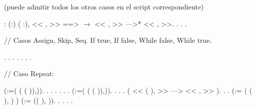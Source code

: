\documentclass[12pt]{report}
\begin{document}
 (puede admitir todos los otros casos en el script correspondiente) \begin{coqdoccode}
\coqdocemptyline
\coqdocemptyline
\coqdocnoindent
{} : \coqdockw{\ensuremath{\forall}} (:) ( :), << , >> ==>  \coqdoceol
\coqdocindent{13.00em}
\ensuremath{\rightarrow}  << , >> --->* << ,  >>.\coqdoceol
\coqdocnoindent
{}.\coqdoceol
\coqdocnoindent
{}.\coqdoceol
\coqdocnoindent
{} .\coqdoceol
\coqdocemptyline
\end{coqdoccode}
// Casos Assign, Skip, Seq. If true, If false, While false, While true. \begin{coqdoccode}
\coqdocemptyline
\coqdocnoindent
{}. . . . . . .\coqdoceol
\end{coqdoccode}
// Caso Repeat: \begin{coqdoccode}
\coqdocemptyline
\coqdocnoindent
{}   (:=(  (   (  )),)).\coqdoceol
\coqdocnoindent
{} .\coqdoceol
\coqdocnoindent
{} .\coqdoceol
\coqdocnoindent
{} .\coqdoceol
\coqdocnoindent
{} .\coqdoceol
\coqdocnoindent
{} .\coqdoceol
\coqdocnoindent
{}.\coqdoceol
\coqdocnoindent
{}   (:=(  (   (  )),)).\coqdoceol
\coqdocnoindent
{} .\coqdoceol
\coqdocnoindent
{} .\coqdoceol
\coqdocnoindent
{} .\coqdoceol
\coqdocnoindent
{} ( <<    (  ),  >>  --->  <<    , >> ).\coqdoceol
\coqdocnoindent
{} .\coqdoceol
\coqdocnoindent
{}.\coqdoceol
\coqdocnoindent
{}   (:= (   (  ), ) ) (:= ((  ), )).\coqdoceol
\coqdocnoindent
{} .\coqdoceol
\coqdocnoindent
{}.\coqdoceol
\coqdocnoindent
{}.\coqdoceol
\coqdocnoindent
{}.\coqdoceol
\end{coqdoccode}
\end{document}
